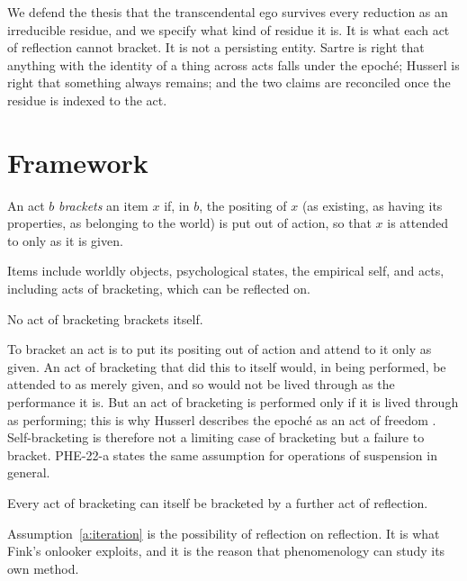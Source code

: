 \documentclass{situationist-preprint}
\begin{document}
We defend the thesis that the transcendental ego survives every reduction as an irreducible residue, and we specify what kind of residue it is. It is what each act of reflection cannot bracket. It is not a persisting entity. Sartre is right that anything with the identity of a thing across acts falls under the epoché; Husserl is right that something always remains; and the two claims are reconciled once the residue is indexed to the act.

\section{Framework}

\begin{definition}\label{d:bracket}
An act $b$ \emph{brackets} an item $x$ if, in $b$, the positing of $x$ (as existing, as having its properties, as belonging to the world) is put out of action, so that $x$ is attended to only as it is given.
\end{definition}

Items include worldly objects, psychological states, the empirical self, and acts, including acts of bracketing, which can be reflected on.

\begin{assumption}[Residue]\label{a:residue}
No act of bracketing brackets itself.
\end{assumption}

To bracket an act is to put its positing out of action and attend to it only as given. An act of bracketing that did this to itself would, in being performed, be attended to as merely given, and so would not be lived through as the performance it is. But an act of bracketing is performed only if it is lived through as performing; this is why Husserl describes the epoché as an act of freedom \citep[§31]{Husserl1913}. Self-bracketing is therefore not a limiting case of bracketing but a failure to bracket. PHE-22-a states the same assumption for operations of suspension in general.

\begin{assumption}[Iteration]\label{a:iteration}
Every act of bracketing can itself be bracketed by a further act of reflection.
\end{assumption}

Assumption~\ref{a:iteration} is the possibility of reflection on reflection. It is what Fink's onlooker exploits, and it is the reason that phenomenology can study its own method.
\end{document}
